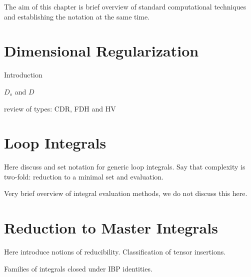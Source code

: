 The aim of this chapter is brief overview of standard computational techniques and
establishing the notation at the same time.

\section{Dimensional Regularization}
Introduction

$D_s$ and $D$

review of types: CDR, FDH and HV


\section{Loop Integrals}

Here discuss and set notation for generic loop integrals.
Say that complexity is two-fold:  reduction to a minimal set and evaluation.

Very brief overview of integral evaluation methods, we do not discuss this here.


\section{Reduction to Master Integrals}
Here introduce notions of reducibility.
Classification of tensor insertions.

Families of integrals closed under IBP identities.


